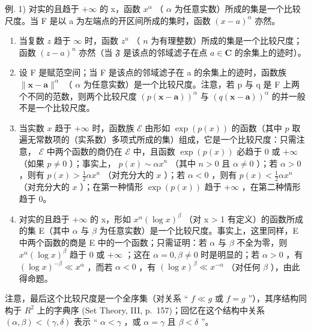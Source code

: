例. 1) 对实的且趋于 \(+\infty\) 的 x，函数 \(x^{\alpha}\) （ \(\alpha\) 为任意实数）所成的集是一个比较尺度。当 F 是以 a 为左端点的开区间所成的集时，函数 \((x - a)^{\alpha}\) 亦然。

\begin{enumerate}
\def\labelenumi{\arabic{enumi})}
\setcounter{enumi}{1}
\item
  当复数 \(z\) 趋于 \(\infty\) 时，函数 \(z^n\) （ \(n\) 为有理整数）所成的集是一个比较尺度；函数 \((z - a)^n\) 亦然（当 \(\mathfrak{F}\) 是该点的邻域滤子在点 \(a \in \mathbf{C}\) 的余集上的迹时）。
\item
  设 F 是赋范空间；当 F 是该点的邻域滤子在 a 的余集上的迹时，函数族 \(\|\mathbf{x}-\mathbf{a}\|^{\alpha}\) （ \(\alpha\) 为任意实数）是一个比较尺度。注意，若 p 与 q 是 F 上两个不同的范数，则两个比较尺度 \(\left(p(\mathbf{x}-\mathbf{a})\right)^{\alpha}\) 与 \(\left(q(\mathbf{x}-\mathbf{a})\right)^{\alpha}\) 的并一般不是一个比较尺度。
\item
  当实数 \(x\) 趋于 \(+\infty\) 时，函数族 \(\mathcal{E}\) 由形如 \(\exp(p(x))\) 的函数（其中 \(p\) 取遍无常数项的（实系数）多项式所成的集）组成，它是一个比较尺度：只需注意， \(\mathcal{E}\) 中两个函数的商仍在 \(\mathcal{E}\) 中，且函数 \(\exp(p(x))\) 必趋于 0 或 \(+\infty\) （如果 \(p \neq 0\) ）；事实上， \(p(x) \sim \alpha x^n\) （其中 \(n > 0\) 且 \(\alpha \neq 0\) ）；若 \(\alpha > 0\) ，则有 \(p(x) > \frac{1}{2}\alpha x^n\) （对充分大的 \(x\) ）；若 \(\alpha < 0\) ，则有 \(p(x) < \frac{1}{2}\alpha x^n\) （对充分大的 \(x\) ）；在第一种情形 \(\exp(p(x))\) 趋于 \(+\infty\) ，在第二种情形趋于 0。
\item
  对实的且趋于 \(+\infty\) 的 x，形如 \(x^{\alpha}(\log x)^{\beta}\) （对 x \textgreater{} 1 有定义）的函数所成的集 E（其中 \(\alpha\) 与 \(\beta\) 为任意实数）是一个比较尺度。事实上，这里同样，E 中两个函数的商是 E 中的一个函数；只需证明：若 \(\alpha\) 与 \(\beta\) 不全为零，则 \(x^{\alpha}(\log x)^{\beta}\) 趋于 0 或 \(+\infty\) ；这在 \(\alpha = 0, \beta \neq 0\) 时是明显的；若 \(\alpha > 0\) ，有 \((\log x)^{-\beta} \ll x^{\alpha}\) ，而若 \(\alpha < 0\) ，有 \((\log x)^{\beta} \ll x^{-\alpha}\) （对任何 \(\beta\) ），由此得命题。
\end{enumerate}

注意，最后这个比较尺度是一个全序集（对关系 “ \(f \ll g\) 或 \(f = g\) ”），其序结构同构于 \(R^{2}\) 上的字典序 (Set Theory, III, p.~157)；回忆在这个结构中关系 \((\alpha, \beta) < (\gamma, \delta)\) 表示 “ \(\alpha < \gamma\) ，或 \(\alpha = \gamma\) 且 \(\beta < \delta\) ”。

